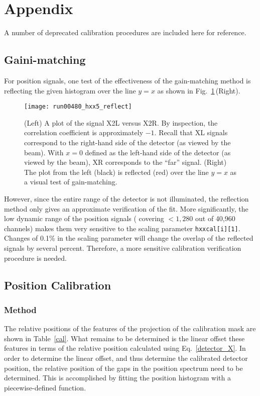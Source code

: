 \section{Appendix}
A number of deprecated calibration procedures are included here for reference.
\subsection{Gaini-matching}
For position signals, one test of the effectiveness of the gain-matching method %
is reflecting the given histogram over the line $y=x$ as shown in Fig.~\ref{reflect}\,(Right).
\begin{figure}
\centering
\texttt{[image: run00480\_hxx5\_reflect]}
\caption{(Left) A plot of the signal X2L versus X2R.  By inspection, the correlation coefficient is approximately $-1$. Recall that XL signals correspond to the right-hand side of the detector (as viewed by the beam).  With $x=0$ defined as the left-hand side of the detector (as viewed by the beam), XR corresponds to the ``far'' signal. (Right) The plot from the left (black) is reflected (red) over the line $y=x$ as a visual test of gain-matching.}
\label{reflect}
\end{figure}
However, since the entire range of the detector is not illuminated, the reflection method only gives an approximate verification of the fit.  More significantly, the low dynamic range of the position signals 
(%
covering $<1,280$ out of 40,960 channels) makes them very sensitive to the scaling parameter \verb|hxxcal[i][1]|.  Changes of 0.1\% in the scaling parameter will change the overlap of the reflected signals by several percent.  Therefore, a more sensitive calibration verification procedure is needed.
\subsection{Position Calibration}
\subsubsection{Method}
The relative positions of the features of the projection of the calibration mask are shown in Table~\ref{cal}.  What remains to be determined is the linear offset these features in terms of the relative position calculated using Eq.~\ref{detector_X}.  In order to determine the linear offset, and thus determine the calibrated detector position, the relative position of the gaps in the position spectrum need to be determined.  This is accomplished by fitting the position histogram with a piecewise-defined function.

